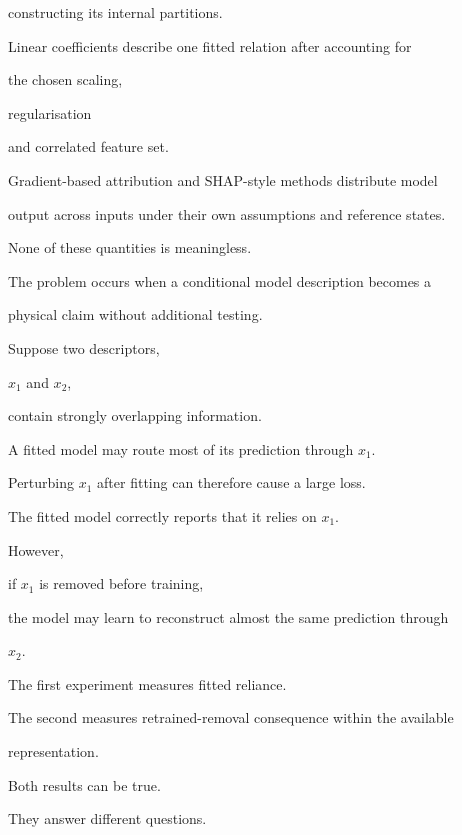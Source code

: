\documentclass[11pt,a4paper,oneside]{report}
\begin{document}
constructing its internal partitions.



Linear coefficients describe one fitted relation after accounting for

the chosen scaling,

regularisation

and correlated feature set.



Gradient-based attribution and SHAP-style methods distribute model

output across inputs under their own assumptions and reference states.



None of these quantities is meaningless.



The problem occurs when a conditional model description becomes a

physical claim without additional testing.



Suppose two descriptors,

$x_1$ and $x_2$,

contain strongly overlapping information.



A fitted model may route most of its prediction through $x_1$.



Perturbing $x_1$ after fitting can therefore cause a large loss.



The fitted model correctly reports that it relies on $x_1$.



However,

if $x_1$ is removed before training,

the model may learn to reconstruct almost the same prediction through

$x_2$.



The first experiment measures fitted reliance.



The second measures retrained-removal consequence within the available

representation.



Both results can be true.



They answer different questions.
\end{document}
